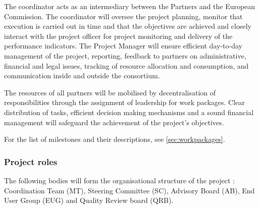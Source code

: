 The coordinator acts as an intermediary between the Partners and
the European Commission. The coordinator will oversee the project
planning, monitor that execution is carried out in time and that
the objectives are achieved and closely interact with the project
officer for project monitoring and delivery of the performance
indicators.  The Project Manager will ensure  efficient day-to-day
management of the project, reporting, feedback to partners on
administrative, financial and legal issues, tracking of  resource
allocation and consumption, and communication inside and outside the
consortium.

The resources of all partners will be mobilised by decentralisation of
responsibilities through the assignment of leadership for work
packages. Clear distribution of tasks, efficient decision making
mechanisms and a sound financial management will safeguard the
achievement of the project's objectives.

For the list of milestones and their descriptions, see \ref{sec:workpackages}.

\subsubsection{Project roles}

The following bodies will form the organisational structure of the
\TheProject project : Coordination Team (MT), Steering Committee (SC),
Advisory Board (AB), End User Group (EUG) and Quality Review board
(QRB).


